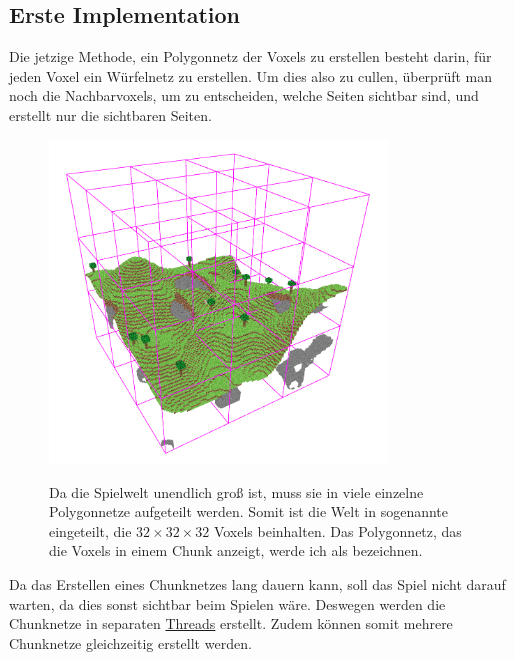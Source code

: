 \subsection{Erste Implementation}

Die jetzige Methode, ein Polygonnetz der Voxels
zu erstellen besteht darin, für jeden Voxel
ein Würfelnetz zu erstellen.
Um dies also zu cullen, überprüft man
noch die Nachbarvoxels, um zu entscheiden,
welche Seiten sichtbar sind, und erstellt nur
die sichtbaren Seiten.

\begin{figure}[ht]
	\begin{minipage}[c]{0.49\textwidth}
		\begin{center}
\includegraphics[width=0.8\textwidth]{../assets/culling/chunk_borders.png}
		\end{center}
	\end{minipage}
	\begin{minipage}[c]{0.49\textwidth}
Da die Spielwelt unendlich groß ist, muss sie
in viele einzelne Polygonnetze aufgeteilt werden.
Somit ist die Welt in sogenannte 
eingeteilt, die $32 \times 32 \times 32$ Voxels
beinhalten. Das Polygonnetz, das die Voxels in einem
Chunk anzeigt, werde ich als
 bezeichnen.
	\end{minipage}\hfill
\end{figure}

Da das Erstellen eines Chunknetzes lang dauern kann,
soll das Spiel nicht darauf warten,
da dies sonst sichtbar beim Spielen wäre.
Deswegen werden die Chunknetze in separaten
\href{https://de.wikipedia.org/wiki/Thread_(Informatik)}{Threads}
\cite{wiki_thread} erstellt.
Zudem können somit mehrere Chunknetze gleichzeitig
erstellt werden.

